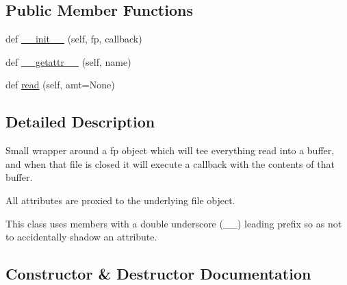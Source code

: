 \subsection*{Public Member Functions}
\begin{DoxyCompactItemize}
\item 
def \hyperlink{classpip_1_1__vendor_1_1cachecontrol_1_1filewrapper_1_1CallbackFileWrapper_a49ca3fa44244778ae11183381e0481b0}{\+\_\+\+\_\+init\+\_\+\+\_\+} (self, fp, callback)
\item 
def \hyperlink{classpip_1_1__vendor_1_1cachecontrol_1_1filewrapper_1_1CallbackFileWrapper_a01696af37bc6df0e23472e0f0c5b1c4d}{\+\_\+\+\_\+getattr\+\_\+\+\_\+} (self, name)
\item 
def \hyperlink{classpip_1_1__vendor_1_1cachecontrol_1_1filewrapper_1_1CallbackFileWrapper_acde77ec4143104f35f677e9c96a32434}{read} (self, amt=None)
\end{DoxyCompactItemize}


\subsection{Detailed Description}
\begin{DoxyVerb}Small wrapper around a fp object which will tee everything read into a
buffer, and when that file is closed it will execute a callback with the
contents of that buffer.

All attributes are proxied to the underlying file object.

This class uses members with a double underscore (__) leading prefix so as
not to accidentally shadow an attribute.
\end{DoxyVerb}
 

\subsection{Constructor \& Destructor Documentation}
\mbox{\label{classpip_1_1__vendor_1_1cachecontrol_1_1filewrapper_1_1CallbackFileWrapper_a49ca3fa44244778ae11183381e0481b0}} 
